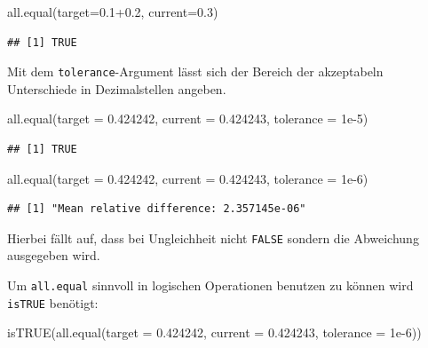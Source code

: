 \documentclass[
]{book}
\newenvironment{Shaded}{\begin{snugshade}}{\end{snugshade}}
\newcommand{\AttributeTok}[1]{\textcolor[rgb]{0.77,0.63,0.00}{#1}}
\newcommand{\FloatTok}[1]{\textcolor[rgb]{0.00,0.00,0.81}{#1}}
\newcommand{\FunctionTok}[1]{\textcolor[rgb]{0.00,0.00,0.00}{#1}}
\newcommand{\NormalTok}[1]{#1}
\begin{document}
\begin{Shaded}
\begin{Highlighting}[]
\FunctionTok{all.equal}\NormalTok{(}\AttributeTok{target=}\FloatTok{0.1+0.2}\NormalTok{, }\AttributeTok{current=}\FloatTok{0.3}\NormalTok{)}
\end{Highlighting}
\end{Shaded}

\begin{verbatim}
## [1] TRUE
\end{verbatim}

Mit dem \texttt{tolerance}-Argument lässt sich der Bereich der akzeptabeln Unterschiede in Dezimalstellen angeben.

\begin{Shaded}
\begin{Highlighting}[]
\FunctionTok{all.equal}\NormalTok{(}\AttributeTok{target =} \FloatTok{0.424242}\NormalTok{, }\AttributeTok{current =} \FloatTok{0.424243}\NormalTok{,}
          \AttributeTok{tolerance =} \FloatTok{1e{-}5}\NormalTok{)}
\end{Highlighting}
\end{Shaded}

\begin{verbatim}
## [1] TRUE
\end{verbatim}

\begin{Shaded}
\begin{Highlighting}[]
\FunctionTok{all.equal}\NormalTok{(}\AttributeTok{target =} \FloatTok{0.424242}\NormalTok{, }\AttributeTok{current =} \FloatTok{0.424243}\NormalTok{,}
          \AttributeTok{tolerance =} \FloatTok{1e{-}6}\NormalTok{)}
\end{Highlighting}
\end{Shaded}

\begin{verbatim}
## [1] "Mean relative difference: 2.357145e-06"
\end{verbatim}

Hierbei fällt auf, dass bei Ungleichheit nicht \texttt{FALSE} sondern die Abweichung ausgegeben wird.

Um \texttt{all.equal} sinnvoll in logischen Operationen benutzen zu können wird \texttt{isTRUE} benötigt:

\begin{Shaded}
\begin{Highlighting}[]
\FunctionTok{isTRUE}\NormalTok{(}\FunctionTok{all.equal}\NormalTok{(}\AttributeTok{target =} \FloatTok{0.424242}\NormalTok{,}
                 \AttributeTok{current =} \FloatTok{0.424243}\NormalTok{,}
                 \AttributeTok{tolerance =} \FloatTok{1e{-}6}\NormalTok{))}
\end{Highlighting}
\end{Shaded}
\end{document}
